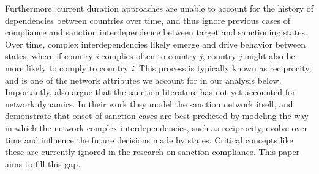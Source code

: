 Furthermore, current duration approaches are unable to account for the history of dependencies between countries over time, and thus ignore previous cases of compliance and sanction interdependence between target and sanctioning states.  Over time, complex interdependencies likely emerge and drive behavior between states, where if country \textit{i} complies often to country \textit{j}, country \textit{j} might also be more likely to comply to country \textit{i}. This process is typically known as reciprocity, and is one of the network attributes we account for in our analysis below. Importantly, \citet{cranmer2014reciprocity} also argue that the sanction literature has not yet accounted for network dynamics. In their work they model the sanction network itself, and demonstrate that onset of sanction cases are best predicted by modeling the way in which the network complex interdependencies, such as reciprocity, evolve over time and influence the future decisions made by states. Critical concepts like these are currently ignored in the research on sanction compliance. This paper aims to fill this gap. 




